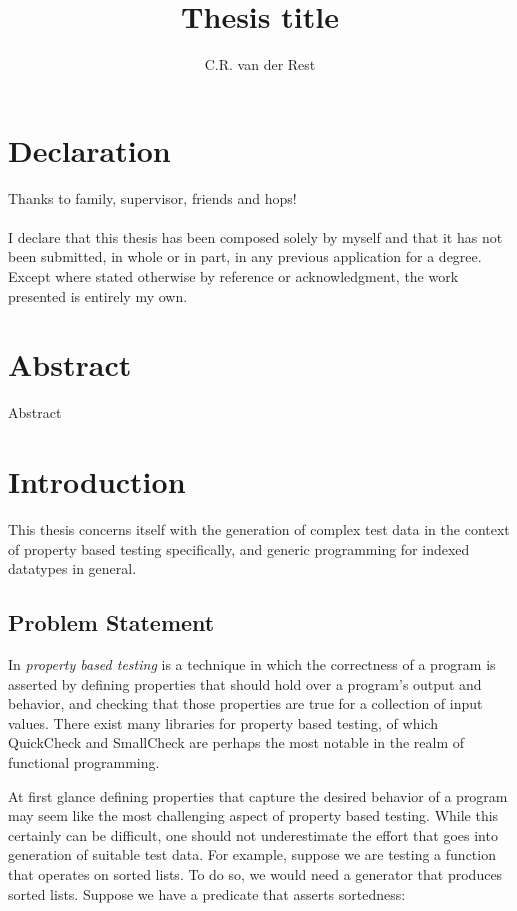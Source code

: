 \documentclass[a4paper,msc,twosized=semi]{uustthesis}
\title{Thesis title}
\author{C.R. van der Rest}
\begin{document}
\maketitle

\frontmatter
\tableofcontents

\chapter{Declaration}
Thanks to family, supervisor, friends and hops!
\\ \\
I declare that this thesis has been composed solely by myself and that it has not been
submitted, in whole or in part, in any previous application for a degree. Except where
stated otherwise by reference or acknowledgment, the work presented is entirely my
own.

\chapter{Abstract}
Abstract

\mainmatter

\chapter{Introduction}
This thesis concerns itself with the generation of complex test data in the context of property based testing specifically, and generic programming for indexed datatypes in general. 

\section{Problem Statement}

  In \emph{property based testing} is a technique in which the correctness of a program is asserted by defining properties that should hold over a program's output and behavior, and checking that those properties are true for a collection of input values. There exist many libraries for property based testing, of which QuickCheck \cite{claessen2011quickcheck} and SmallCheck \cite{runciman2008smallcheck} are perhaps the most notable in the realm of functional programming. 

  At first glance defining properties that capture the desired behavior of a program may seem like the most challenging aspect of property based testing. While this certainly can be difficult, one should not underestimate the effort that goes into generation of suitable test data. For example, suppose we are testing a function that operates on sorted lists. To do so, we would need a generator that produces sorted lists. Suppose we have a predicate that asserts sortedness: 
\end{document}
